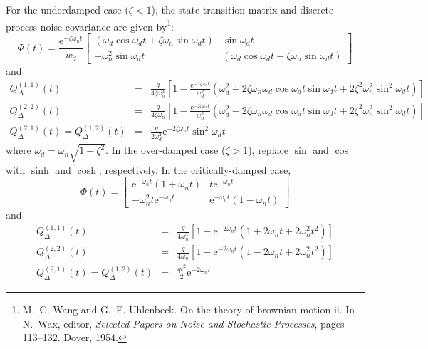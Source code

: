 For the underdamped case ($\zeta < 1$), the state transition matrix and discrete process noise covariance are given by\footnote{M.~C. Wang and G.~E. Uhlenbeck. On the theory of brownian motion ii. In N.~Wax, editor, {\em Selected Papers on Noise and Stochastic Processes}, pages 113--132. Dover, 1954.}:
\begin{equation}
	\Phi(t) = \frac{\text{e}^{-\zeta\omega_{n}t}}{w_{d}}
	\begin{bmatrix}
		(\omega_{d}\cos\omega_{d}t + \zeta\omega_{n}\sin\omega_{d}t) &
		\sin\omega_{d}t  \\
		-\omega_{n}^{2}\sin\omega_{d}t &
		(\omega_{d}\cos\omega_{d}t - \zeta\omega_{n}\sin\omega_{d}t)
	\end{bmatrix}
\end{equation}
and
\begin{eqnarray}
	Q^{(1,1)}_\Delta(t) &=&  \frac{q}{4\zeta\omega_{n}^{3}}\left[ 1
	- \frac{\text{e}^{-2\zeta\omega_{n}t}}{w_{d}^{2}}(\omega_{d}^{2}
	+ 2\zeta\omega_{n}\omega_{d}\cos\omega_{d}t\sin\omega_{d}t
	+ 2\zeta^{2}\omega_{n}^{2}\sin^{2}\omega_{d}t)\right] \\
	Q^{(2,2)}_\Delta(t) &=&  \frac{q}{4\zeta\omega_{n}}\left[ 1
	- \frac{\text{e}^{-2\zeta\omega_{n}t}}{w_{d}^{2}}(\omega_{d}^{2}
	- 2\zeta\omega_{n}\omega_{d}\cos\omega_{d}t\sin\omega_{d}t
	+ 2\zeta^{2}\omega_{n}^{2}\sin^{2}\omega_{d}t)\right] \\
	Q^{(2,1)}_\Delta(t) = Q^{(1,2)}_\Delta(t) &=& \frac{q}{2\omega_{d}^{2}}
	\text{e}^{-2\zeta\omega_{n}t}\sin^{2}\omega_{d}t
\end{eqnarray}
where $\omega_d = \omega_n\sqrt{1-\zeta^2}$. In the over-damped case ($\zeta > 1$), replace $\sin$ and $\cos$ with $\sinh$ and $\cosh$, respectively.  In the critically-damped case,
\begin{equation}
	\Phi(t) =
	\begin{bmatrix}
		\text{e}^{-\omega_{n}t}(1 + \omega_{n}t) &
		t\text{e}^{-\omega_{n}t}  \\
		-\omega_{n}^{2}t\text{e}^{-\omega_{n}t} &
		 \text{e}^{-\omega_{n}t}(1 - \omega_{n}t)
	\end{bmatrix}
\end{equation}
and
\begin{eqnarray}
	Q^{(1,1)}_\Delta(t) &=& \frac{q}{4\omega_{n}^{3}}\left[ 1
	- \text{e}^{-2\omega_{n}t}(1
	+ 2\omega_{n}t
	+ 2\omega_{n}^{2}t^2)\right]  \\
	Q^{(2,2)}_\Delta(t) &=& \frac{q}{4\omega_{n}}\left[ 1
	- \text{e}^{-2\omega_{n}t}(1
	- 2\omega_{n}t
	+ 2\omega_{n}^{2}t^2)\right]  \\
	Q^{(2,1)}_\Delta(t) = Q^{(1,2)}_\Delta(t) &=& \frac{q t^2}{2}
	\text{e}^{-2\omega_{n}t}
\end{eqnarray}

